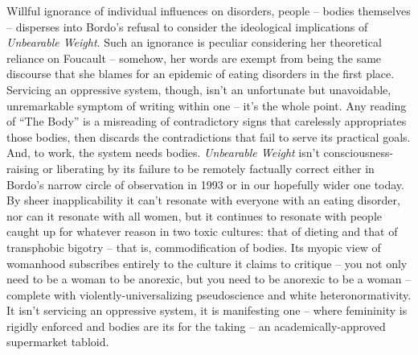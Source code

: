 \documentclass[11pt]{article}
\begin{document}
    Willful ignorance of individual influences on disorders, people -- bodies themselves -- disperses into Bordo's refusal to consider the ideological implications of \textit{Unbearable Weight}. Such an ignorance is peculiar considering her theoretical reliance on Foucault -- somehow, her words are exempt from being the same discourse that she blames for an epidemic of eating disorders in the first place. Servicing an oppressive system, though, isn't an unfortunate but unavoidable, unremarkable symptom of writing within one -- it's the whole point. Any reading of ``The Body'' is a misreading of contradictory signs that carelessly appropriates those bodies, then discards the contradictions that fail to serve its practical goals. And, to work, the system needs bodies. \textit{Unbearable Weight} isn't consciousness-raising or liberating by its failure to be remotely factually correct either in Bordo's narrow circle of observation in 1993 or in our hopefully wider one today. By sheer inapplicability it can't resonate with everyone with an eating disorder, nor can it resonate with all women, but it continues to resonate with people caught up for whatever reason in two toxic cultures: that of dieting and that of transphobic bigotry -- that is, commodification of bodies. Its myopic view of womanhood subscribes entirely to the culture it claims to critique -- you not only need to be a woman to be anorexic, but you need to be anorexic to be a woman -- complete with violently-universalizing pseudoscience and white heteronormativity. It isn't servicing an oppressive system, it is manifesting one -- where femininity is rigidly enforced and bodies are its for the taking -- an academically-approved supermarket tabloid.

    \newpage
    \printbibliography[title={Bibliography}]
\end{document}
